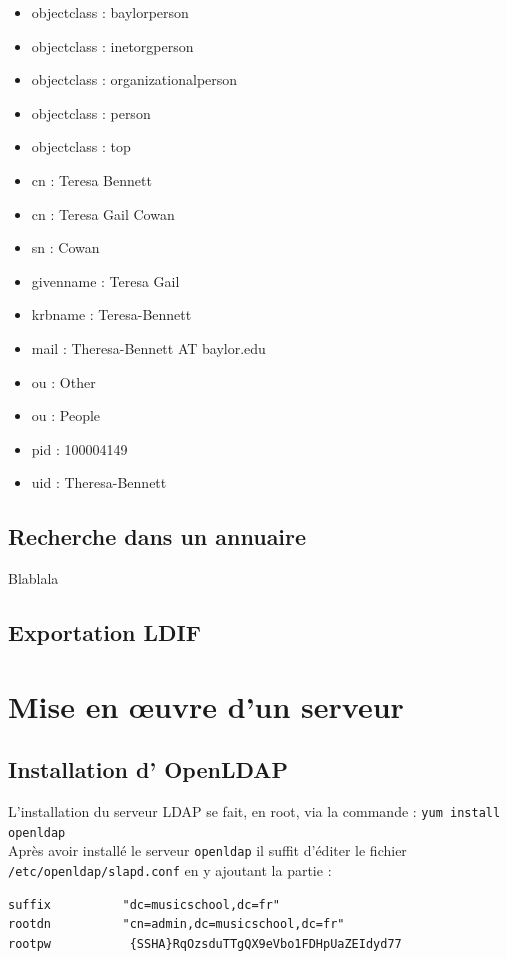 \documentclass[12pt,a4paper,notitlepage]{article}
\begin{document}
\begin{itemize}
\item objectclass : baylorperson
\item objectclass : inetorgperson
\item objectclass : organizationalperson
\item objectclass : person
\item objectclass : top
\item cn : Teresa Bennett
\item cn : Teresa Gail Cowan
\item sn : Cowan
\item givenname : Teresa Gail
\item krbname : Teresa-Bennett
\item mail : Theresa-Bennett AT baylor.edu
\item ou : Other
\item ou : People
\item pid : 100004149
\item uid : Theresa-Bennett
\end{itemize}

  
\subsection{Recherche dans un annuaire}
Blablala

\subsection{Exportation LDIF}


\clearpage
\section{Mise en \oe uvre d'un serveur}
\subsection{Installation d' OpenLDAP}

L'installation du serveur LDAP se fait, en root, via la commande : \texttt{yum install openldap}\\

Après avoir installé le serveur \texttt{openldap} il suffit d'éditer le fichier \texttt{/etc/openldap/slapd.conf} en y ajoutant la partie : 

\begin{lstlisting}[title=Contenu du fichier slapd.conf]
suffix          "dc=musicschool,dc=fr"
rootdn          "cn=admin,dc=musicschool,dc=fr"
rootpw           {SSHA}RqOzsduTTgQX9eVbo1FDHpUaZEIdyd77

\end{lstlisting}
\end{document}
